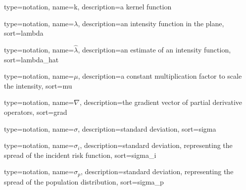 


{%
   type=notation,
   name={k},
   description={a kernel function}
}

{%
   type=notation,
   name={\ensuremath{\lambda}},
   description={an intensity function in the plane},
   sort={lambda}
}

{%
   type=notation,
   name={\ensuremath{\hat{\lambda}}},
   description={an estimate of an intensity function},
   sort={lambda_hat}
}

{%
   type=notation,
   name={\ensuremath{\mu}},
   description={a constant multiplication factor to scale the intensity},
   sort={mu}
}

{%
   type=notation,
   name={\ensuremath{\nabla}},
   description={the gradient vector of partial derivative operators},
   sort={grad}
}

{%
   type=notation,
   name={\ensuremath{\sigma}},
   description={standard deviation},
   sort={sigma}
}

{%
   type=notation,
   name={\ensuremath{\sigma_i}},
   description={standard deviation, representing the spread of the incident risk function},
   sort={sigma_i}
}

{%
   type=notation,
   name={\ensuremath{\sigma_p}},
   description={standard deviation, representing the spread of the population distribution},
   sort={sigma_p}
}




